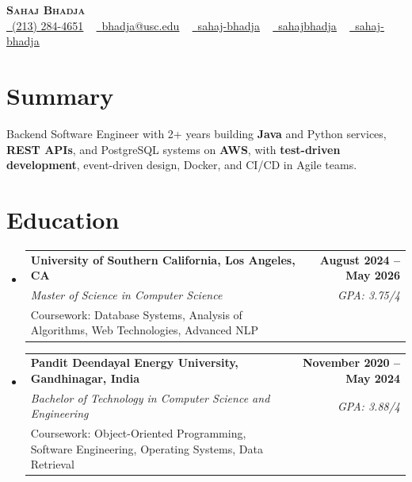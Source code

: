 \documentclass[letterpaper,10pt]{article}
\makeatletter
\newcommand{\sectionGap}{\vspace{-8pt}}
\newcommand{\resumeEduSubheading}[5]{\vspace{-1pt}\item\begin{tabular*}{1.0\textwidth}[t]{l@{\extracolsep{\fill}}r}\textbf{#1} & \textbf{\small #2} \\\textit{\small #3} & \textit{\small #4} \\\small #5 & \\\end{tabular*}\vspace{-4pt}}
\newcommand{\resumeSubHeadingListStart}{\begin{itemize}[leftmargin=0.0in, label={}]}
\newcommand{\resumeSubHeadingListEnd}{\end{itemize}}
\makeatother
\begin{document}
\begin{center}
{\Huge \scshape \textbf{Sahaj Bhadja}} \\ \vspace{1pt}
\small \href{tel:2132844651}{\faPhone\ \underline{(213) 284-4651}} ~ \href{mailto:bhadja@usc.edu}{\raisebox{-0.2\height}\faEnvelope\ \underline{bhadja@usc.edu}} ~
\href{https://www.linkedin.com/in/sahaj-bhadja/}{\raisebox{-0.2\height}\faLinkedin\ \underline{sahaj-bhadja}} ~ \href{https://github.com/SAHAJ-BHADJA}{\raisebox{-0.2\height}\faGithub\ \underline{sahajbhadja}} ~
\href{https://sahaj-bhadja.vercel.app/}{\raisebox{-0.2\height}\faGlobe\ \underline{sahaj-bhadja}}
\end{center}
\vspace{-16pt}
\section{Summary}
\begin{itemize}[leftmargin=0.15in, label={}]
\small{\item{Backend Software Engineer with 2+ years building \textbf{Java} and Python services, \textbf{REST APIs}, and PostgreSQL systems on \textbf{AWS}, with \textbf{test-driven development}, event-driven design, Docker, and CI/CD in Agile teams.}}
\end{itemize}
\sectionGap
\section{Education}
\resumeSubHeadingListStart
\resumeEduSubheading{University of Southern California, Los Angeles, CA}{August 2024 -- May 2026}{Master of Science in Computer Science}{GPA: 3.75/4}{Coursework: Database Systems, Analysis of Algorithms, Web Technologies, Advanced NLP}
\resumeEduSubheading{Pandit Deendayal Energy University, Gandhinagar, India}{November 2020 -- May 2024}{Bachelor of Technology in Computer Science and Engineering}{GPA: 3.88/4}{Coursework: Object-Oriented Programming, Software Engineering, Operating Systems, Data Retrieval}
\resumeSubHeadingListEnd
\sectionGap
\end{document}
